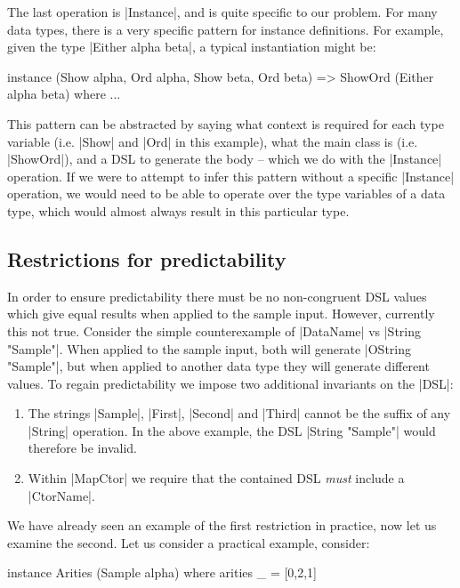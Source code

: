 \documentclass[preprint]{sigplanconf}
\begin{document}
The last operation is |Instance|, and is quite specific to our problem. For many data types, there is a very specific pattern for instance definitions. For example, given the type |Either alpha beta|, a typical instantiation might be:

\begin{code}
instance (Show alpha, Ord alpha, Show beta, Ord beta) => ShowOrd (Either alpha beta) where
    ...
\end{code}

This pattern can be abstracted by saying what context is required for each type variable (i.e. |Show| and |Ord| in this example), what the main class is (i.e. |ShowOrd|), and a DSL to generate the body -- which we do with the |Instance| operation. If we were to attempt to infer this pattern without a specific |Instance| operation, we would need to be able to operate over the type variables of a data type, which would almost always result in this particular type.

\subsection{Restrictions for predictability}
\label{sec:predictability}

In order to ensure predictability there must be no non-congruent DSL values which give equal results when applied to the sample input. However, currently this not true. Consider the simple counterexample of |DataName| vs |String "Sample"|. When applied to the sample input, both will generate |OString "Sample"|, but when applied to another data  type they will generate different values. To regain predictability we impose two additional invariants on the |DSL|:

\begin{enumerate}
\item The strings |Sample|, |First|, |Second| and |Third| cannot be the suffix of any |String| operation. In the above example, the DSL |String "Sample"| would therefore be invalid.
\item Within |MapCtor| we require that the contained DSL \textit{must} include a |CtorName|.
\end{enumerate}

We have already seen an example of the first restriction in practice, now let us examine the second. Let us consider a practical example, consider:

\begin{code}
instance Arities (Sample alpha) where
    arities _ = [0,2,1]
\end{code}
\end{document}
